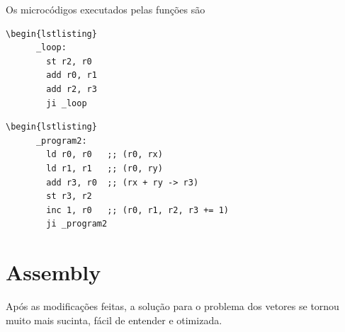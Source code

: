 \documentclass{article}  %
\begin{document}
    Os microcódigos executados pelas funções são

    \renewcommand{\lstlistingname}{Microcódigo}
    \begin{lstlisting}[caption={Load Vector}]
    \begin{lstlisting}
      _loop:
        st r2, r0
        add r0, r1
        add r2, r3
        ji _loop
    \end{lstlisting}
      
    \renewcommand{\lstlistingname}{Microcódigo}
    \begin{lstlisting}[caption={Add Vector}]
    \begin{lstlisting}
      _program2:
        ld r0, r0   ;; (r0, rx)
        ld r1, r1   ;; (r0, ry)
        add r3, r0  ;; (rx + ry -> r3)
        st r3, r2
        inc 1, r0   ;; (r0, r1, r2, r3 += 1)
        ji _program2
    \end{lstlisting}

    \clearpage
    \section{Assembly}

    Após as modificações feitas, a solução para o problema dos vetores se tornou muito mais sucinta, fácil de entender e otimizada.
\end{document}
